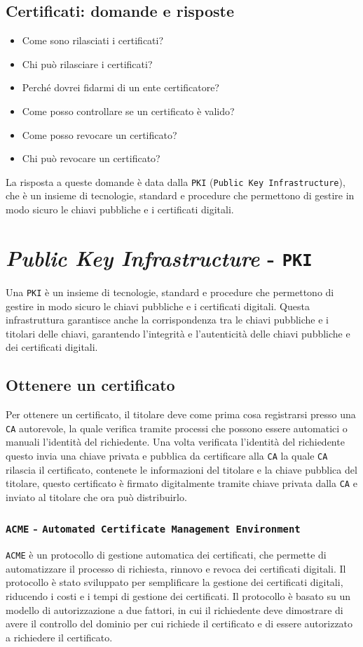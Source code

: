     \subsection{Certificati: domande e risposte}
        \begin{itemize}
            \item Come sono rilasciati i certificati?
            \item Chi può rilasciare i certificati?
            \item Perché dovrei fidarmi di un ente certificatore?
            \item Come posso controllare se un certificato è valido?
            \item Come posso revocare un certificato?
            \item Chi può revocare un certificato?
        \end{itemize}
        La risposta a queste domande è data dalla \texttt{PKI} (\texttt{Public Key Infrastructure}), che è un insieme di tecnologie, standard e procedure che permettono di gestire in modo sicuro le chiavi pubbliche e i certificati digitali.
\section{\textit{Public Key Infrastructure} - \texttt{PKI}}
    Una \texttt{PKI} è un insieme di tecnologie, standard e procedure che permettono di gestire in modo sicuro le chiavi pubbliche e i certificati digitali. Questa infrastruttura garantisce anche la corrispondenza tra le chiavi pubbliche e i titolari delle chiavi, garantendo l'integrità e l'autenticità delle chiavi pubbliche e dei certificati digitali.
    \subsection{Ottenere un certificato}
        Per ottenere un certificato, il titolare deve come prima cosa registrarsi presso una \texttt{CA} autorevole, la quale verifica tramite processi che possono essere automatici o manuali l'identità del richiedente. Una volta verificata l'identità del richiedente questo invia una chiave privata e pubblica da certificare alla \texttt{CA} la quale \texttt{CA} rilascia il certificato, contenete le informazioni del titolare e la chiave pubblica del titolare, questo certificato è firmato digitalmente tramite chiave privata dalla \texttt{CA} e inviato al titolare che ora può distribuirlo.
        \subsubsection{\texttt{ACME} - \texttt{Automated Certificate Management Environment}}
            \texttt{ACME} è un protocollo di gestione automatica dei certificati, che permette di automatizzare il processo di richiesta, rinnovo e revoca dei certificati digitali. Il protocollo è stato sviluppato per semplificare la gestione dei certificati digitali, riducendo i costi e i tempi di gestione dei certificati. Il protocollo è basato su un modello di autorizzazione a due fattori, in cui il richiedente deve dimostrare di avere il controllo del dominio per cui richiede il certificato e di essere autorizzato a richiedere il certificato.
